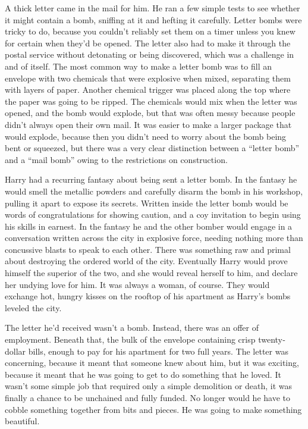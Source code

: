 \documentclass[ebook,12pt]{memoir}
\begin{document}
A thick letter came in the mail for him. He ran a few simple tests to
see whether it might contain a bomb, sniffing at it and hefting it
carefully. Letter bombs were tricky to do, because you couldn't reliably
set them on a timer unless you knew for certain when they'd be opened.
The letter also had to make it through the postal service without
detonating or being discovered, which was a challenge in and of itself.
The most common way to make a letter bomb was to fill an envelope with
two chemicals that were explosive when mixed, separating them with
layers of paper. Another chemical trigger was placed along the top where
the paper was going to be ripped. The chemicals would mix when the
letter was opened, and the bomb would explode, but that was often messy
because people didn't always open their own mail. It was easier to make
a larger package that would explode, because then you didn't need to
worry about the bomb being bent or squeezed, but there was a very clear
distinction between a ``letter bomb'' and a ``mail bomb'' owing to the
restrictions on construction.

Harry had a recurring fantasy about being sent a letter bomb. In the
fantasy he would smell the metallic powders and carefully disarm the
bomb in his workshop, pulling it apart to expose its secrets. Written
inside the letter bomb would be words of congratulations for showing
caution, and a coy invitation to begin using his skills in earnest. In
the fantasy he and the other bomber would engage in a conversation
written across the city in explosive force, needing nothing more than
concussive blasts to speak to each other. There was something raw and
primal about destroying the ordered world of the city. Eventually Harry
would prove himself the superior of the two, and she would reveal
herself to him, and declare her undying love for him. It was always a
woman, of course. They would exchange hot, hungry kisses on the rooftop
of his apartment as Harry's bombs leveled the city.

The letter he'd received wasn't a bomb. Instead, there was an offer of
employment. Beneath that, the bulk of the envelope containing crisp
twenty‐dollar bills, enough to pay for his apartment for two full years.
The letter was concerning, because it meant that someone knew about him,
but it was exciting, because it meant that he was going to get to do
something that he loved. It wasn't some simple job that required only a
simple demolition or death, it was finally a chance to be unchained and
fully funded. No longer would he have to cobble something together from
bits and pieces. He was going to make something beautiful.
\end{document}
